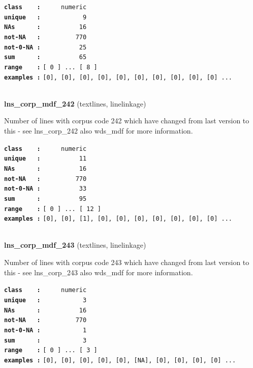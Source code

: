 \documentclass[]{article}
\begin{document}
\textbf{\texttt{class\ \ \ \ :}} \texttt{~~~~~numeric}\\
\textbf{\texttt{unique\ \ \ :}} \texttt{~~~~~~~~~~~9}\\
\textbf{\texttt{NAs\ \ \ \ \ \ :}} \texttt{~~~~~~~~~~16}\\
\textbf{\texttt{not-NA\ \ \ :}} \texttt{~~~~~~~~~770}\\
\textbf{\texttt{not-0-NA\ :}} \texttt{~~~~~~~~~~25}\\
\textbf{\texttt{sum\ \ \ \ \ \ :}} \texttt{~~~~~~~~~~65}\\
\textbf{\texttt{range\ \ \ \ :}}
\texttt{{[}\ 0\ {]}\ ...\ {[}\ 8\ {]}}\\
\textbf{\texttt{examples\ :}}
\texttt{{[}0{]},\ {[}0{]},\ {[}0{]},\ {[}0{]},\ {[}0{]},\ {[}0{]},\ {[}0{]},\ {[}0{]},\ {[}0{]},\ {[}0{]}\ ...}\\

~

\textbf{lns\_corp\_mdf\_242} (textlines, linelinkage)

Number of lines with corpus code 242 which have changed from last
version to this - see lns\_corp\_242 also wds\_mdf for more information.

\textbf{\texttt{class\ \ \ \ :}} \texttt{~~~~~numeric}\\
\textbf{\texttt{unique\ \ \ :}} \texttt{~~~~~~~~~~11}\\
\textbf{\texttt{NAs\ \ \ \ \ \ :}} \texttt{~~~~~~~~~~16}\\
\textbf{\texttt{not-NA\ \ \ :}} \texttt{~~~~~~~~~770}\\
\textbf{\texttt{not-0-NA\ :}} \texttt{~~~~~~~~~~33}\\
\textbf{\texttt{sum\ \ \ \ \ \ :}} \texttt{~~~~~~~~~~95}\\
\textbf{\texttt{range\ \ \ \ :}}
\texttt{{[}\ 0\ {]}\ ...\ {[}\ 12\ {]}}\\
\textbf{\texttt{examples\ :}}
\texttt{{[}0{]},\ {[}0{]},\ {[}1{]},\ {[}0{]},\ {[}0{]},\ {[}0{]},\ {[}0{]},\ {[}0{]},\ {[}0{]},\ {[}0{]}\ ...}\\

~

\textbf{lns\_corp\_mdf\_243} (textlines, linelinkage)

Number of lines with corpus code 243 which have changed from last
version to this - see lns\_corp\_243 also wds\_mdf for more information.

\textbf{\texttt{class\ \ \ \ :}} \texttt{~~~~~numeric}\\
\textbf{\texttt{unique\ \ \ :}} \texttt{~~~~~~~~~~~3}\\
\textbf{\texttt{NAs\ \ \ \ \ \ :}} \texttt{~~~~~~~~~~16}\\
\textbf{\texttt{not-NA\ \ \ :}} \texttt{~~~~~~~~~770}\\
\textbf{\texttt{not-0-NA\ :}} \texttt{~~~~~~~~~~~1}\\
\textbf{\texttt{sum\ \ \ \ \ \ :}} \texttt{~~~~~~~~~~~3}\\
\textbf{\texttt{range\ \ \ \ :}}
\texttt{{[}\ 0\ {]}\ ...\ {[}\ 3\ {]}}\\
\textbf{\texttt{examples\ :}}
\texttt{{[}0{]},\ {[}0{]},\ {[}0{]},\ {[}0{]},\ {[}0{]},\ {[}NA{]},\ {[}0{]},\ {[}0{]},\ {[}0{]},\ {[}0{]}\ ...}\\
\end{document}
